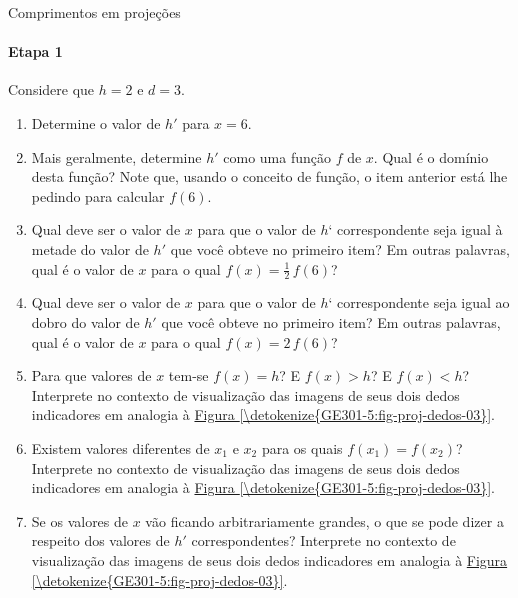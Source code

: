 \begin{task}{Comprimentos em projeções}
\needspace{.15\textheight}

\paragraph{Etapa 1}

Considere que \(h = 2\) e \(d = 3\).
\begin{enumerate}
\item {} 
Determine o valor de \(h'\) para \(x = 6\).

\item {} 
Mais geralmente, determine \(h'\) como uma função \(f\) de \(x\). Qual é o domínio desta função? Note que, usando o conceito de função, o item anterior está lhe pedindo para calcular \(f(6)\).

\item {} 
Qual deve ser o valor de \(x\) para que o valor de \(h\)‘ correspondente seja igual à metade do valor de \(h'\) que você obteve no primeiro item? Em outras palavras, qual é o valor de \(x\) para o qual \(f(x) = \frac{1}{2} \, f(6)\)?

\item {} 
Qual deve ser o valor de \(x\) para que o valor de \(h\)‘ correspondente seja igual ao dobro do valor de \(h'\) que você obteve no primeiro item? Em outras palavras, qual é o valor de \(x\) para o qual \(f(x) = 2 \, f(6)\)?

\item {} 
Para que valores de \(x\) tem-se \(f(x) = h\)? E \(f(x) > h\)? E \(f(x) < h\)? Interprete no contexto de visualização das imagens de seus dois dedos indicadores em analogia à \hyperref[\detokenize{GE301-5:fig-proj-dedos-03}]{Figura \ref{\detokenize{GE301-5:fig-proj-dedos-03}}}.

\item {} 
Existem valores diferentes de \(x_{1}\) e \(x_{2}\) para os quais \(f(x_{1}) = f(x_{2})\)? Interprete no contexto de visualização das imagens de seus dois dedos indicadores em analogia à \hyperref[\detokenize{GE301-5:fig-proj-dedos-03}]{Figura \ref{\detokenize{GE301-5:fig-proj-dedos-03}}}.

\item {} 
Se os valores de \(x\) vão ficando arbitrariamente grandes, o que se pode dizer a respeito dos valores de \(h'\) correspondentes? Interprete no contexto de visualização das imagens de seus dois dedos indicadores em analogia à \hyperref[\detokenize{GE301-5:fig-proj-dedos-03}]{Figura \ref{\detokenize{GE301-5:fig-proj-dedos-03}}}.


\end{enumerate}
\end{task}
